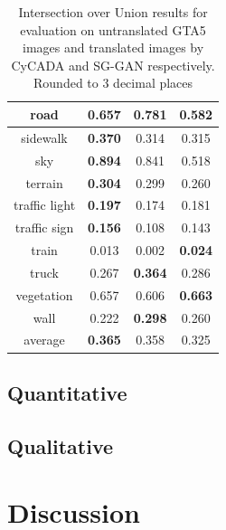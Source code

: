 \begin{table}
\begin{tabular}{|c|c|c|c|}
		\hline 
		road & 0.657 & \textbf{0.781} & 0.582 \\ 
		\hline 
		sidewalk & \textbf{0.370} & 0.314 & 0.315 \\ 
		\hline 
		sky & \textbf{0.894} & 0.841 & 0.518 \\ 
		\hline 
		terrain & \textbf{0.304} & 0.299 & 0.260 \\ 
		\hline 
		traffic light & \textbf{0.197} & 0.174 & 0.181 \\ 
		\hline 
		traffic sign & \textbf{0.156} & 0.108 & 0.143 \\ 
		\hline 
		train & 0.013 & 0.002 & \textbf{0.024} \\ 
		\hline 
		truck & 0.267 & \textbf{0.364} & 0.286 \\ 
		\hline 
		vegetation & 0.657 & 0.606 & \textbf{0.663} \\ 
		\hline 
		wall & 0.222 & \textbf{0.298} & 0.260 \\ 
		\hline \hline 
		average & \textbf{0.365} & 0.358 & 0.325\\
		\hline
	\end{tabular} 
	\caption{Intersection over Union results for evaluation on untranslated GTA5 images and translated images by CyCADA and SG-GAN respectively. Rounded to 3 decimal places}
	\label{table:results}
\end{table}

\subsection{Quantitative}

\subsection{Qualitative}

\section{Discussion}

